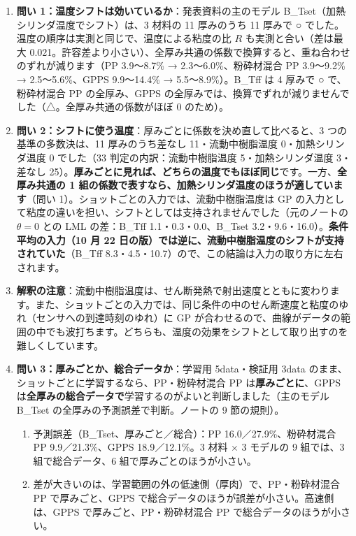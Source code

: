 \documentclass[paper=a4paper,fontsize=10.5pt,line_length=44zw,number_of_lines=38]{jlreq}
\begin{document}
\begin{enumerate}[itemsep=0.8ex,topsep=0.6ex]
\item \textbf{問い 1：温度シフトは効いているか}：発表資料の主のモデル B\_Tset（加熱シリンダ温度でシフト）は、3 材料の 11 厚みのうち 11 厚みで ○ でした。温度の順序は実測と同じで、温度による粘度の比 $R$ も実測と合い（差は最大 0.021。許容差より小さい）、全厚み共通の係数で換算すると、重ね合わせのずれが減ります（PP 3.9〜8.7\% → 2.3〜6.0\%、粉砕材混合 PP 3.9〜9.2\% → 2.5〜5.6\%、GPPS 9.9〜14.4\% → 5.5〜8.9\%）。B\_Tff は 4 厚みで ○ で、粉砕材混合 PP の全厚み、GPPS の全厚みでは、換算でずれが減りませんでした（△。全厚み共通の係数がほぼ 0 のため）。
\item \textbf{問い 2：シフトに使う温度}：厚みごとに係数を決め直して比べると、3 つの基準の多数決は、11 厚みのうち差なし 11・流動中樹脂温度 0・加熱シリンダ温度 0 でした（33 判定の内訳：流動中樹脂温度 5・加熱シリンダ温度 3・差なし 25）。\textbf{厚みごとに見れば、どちらの温度でもほぼ同じ}です。一方、\textbf{全厚み共通の 1 組の係数で表すなら、加熱シリンダ温度のほうが適しています}（問い 1）。ショットごとの入力では、流動中樹脂温度は GP の入力として粘度の違いを担い、シフトとしては支持されませんでした（元のノートの $\theta=0$ との LML の差：B\_Tff 1.1・0.3・0.0、B\_Tset 3.2・9.6・16.0）。\textbf{条件平均の入力（10 月 22 日の版）では逆に、流動中樹脂温度のシフトが支持されていた}（B\_Tff 8.3・4.5・10.7）ので、この結論は入力の取り方に左右されます。
\item \textbf{解釈の注意}：流動中樹脂温度は、せん断発熱で射出速度とともに変わります。また、ショットごとの入力では、同じ条件の中のせん断速度と粘度のゆれ（センサへの到達時刻のゆれ）に GP が合わせるので、曲線がデータの範囲の中でも波打ちます。どちらも、温度の効果をシフトとして取り出すのを難しくしています。
\item \textbf{問い 3：厚みごとか、総合データか}：学習用 5data・検証用 3data のまま、ショットごとに学習するなら、PP・粉砕材混合 PP は\textbf{厚みごとに}、GPPS は\textbf{全厚みの総合データで}学習するのがよいと判断しました（主のモデル B\_Tset の全厚みの予測誤差で判断。ノートの 9 節の規則）。
\begin{enumerate}[label=(\roman*),itemsep=0.3ex,topsep=0.3ex]
\item 予測誤差（B\_Tset、厚みごと／総合）：PP 16.0／27.9\%、粉砕材混合 PP 9.9／21.3\%、GPPS 18.9／12.1\%。3 材料 $\times$ 3 モデルの 9 組では、3 組で総合データ、6 組で厚みごとのほうが小さい。
\item 差が大きいのは、学習範囲の外の低速側（厚肉）で、PP・粉砕材混合 PP で厚みごと、GPPS で総合データのほうが誤差が小さい。高速側は、GPPS で厚みごと、PP・粉砕材混合 PP で総合データのほうが小さい。

\end{enumerate}
\end{enumerate}
\end{document}
